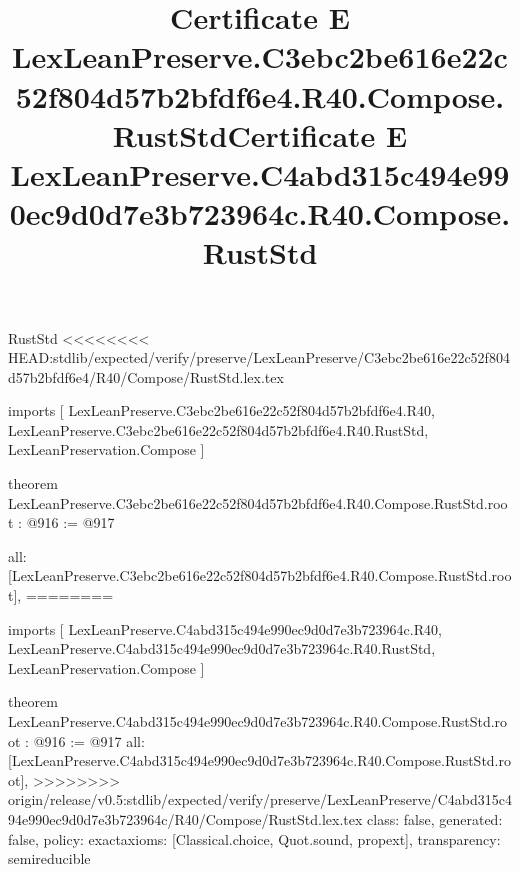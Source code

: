 \begin{lexlean}{RustStd}
<<<<<<<< HEAD:stdlib/expected/verify/preserve/LexLeanPreserve/C3ebc2be616e22c52f804d57b2bfdf6e4/R40/Compose/RustStd.lex.tex
\title{Certificate E LexLeanPreserve.C3ebc2be616e22c52f804d57b2bfdf6e4.R40.Compose.RustStd}
\begin{coremodule}
imports [
  LexLeanPreserve.C3ebc2be616e22c52f804d57b2bfdf6e4.R40,
  LexLeanPreserve.C3ebc2be616e22c52f804d57b2bfdf6e4.R40.RustStd,
  LexLeanPreservation.Compose
]

theorem LexLeanPreserve.C3ebc2be616e22c52f804d57b2bfdf6e4.R40.Compose.RustStd.root : @916 := @917 {
  all: [LexLeanPreserve.C3ebc2be616e22c52f804d57b2bfdf6e4.R40.Compose.RustStd.root],
========
\title{Certificate E LexLeanPreserve.C4abd315c494e990ec9d0d7e3b723964c.R40.Compose.RustStd}
\begin{coremodule}
imports [
  LexLeanPreserve.C4abd315c494e990ec9d0d7e3b723964c.R40,
  LexLeanPreserve.C4abd315c494e990ec9d0d7e3b723964c.R40.RustStd,
  LexLeanPreservation.Compose
]

theorem LexLeanPreserve.C4abd315c494e990ec9d0d7e3b723964c.R40.Compose.RustStd.root : @916 := @917 {
  all: [LexLeanPreserve.C4abd315c494e990ec9d0d7e3b723964c.R40.Compose.RustStd.root],
>>>>>>>> origin/release/v0.5:stdlib/expected/verify/preserve/LexLeanPreserve/C4abd315c494e990ec9d0d7e3b723964c/R40/Compose/RustStd.lex.tex
  class: false,
  generated: false,
  policy: exact{axioms: [Classical.choice, Quot.sound, propext]},
  transparency: semireducible
}


\end{coremodule}}
\end{coremodule}
\end{lexlean}
